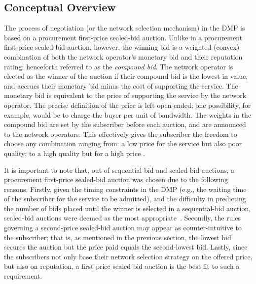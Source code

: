 \subsection{Conceptual Overview} %
\label{sub:conceptual_overview_dmp}
The process of negotiation (or the network selection mechanism) in the DMP is based on a procurement first-price sealed-bid auction. Unlike in a procurement first-price sealed-bid auction, however, the winning bid is a weighted (convex) combination of both the network operator's monetary bid and their reputation rating; henceforth referred to as the \emph{compound bid}. The network operator is elected as the winner of the auction if their compound bid is the lowest in value, and accrues their monetary bid minus the cost of supporting the service. The monetary bid is equivalent to the price of supporting the service by the network operator. The precise definition of the price is left open-ended; one possibility, for example, would be to charge the buyer per unit of bandwidth. The weights in the compound bid are set by the subscriber before each auction, and are announced to the network operators. This effectively gives the subscriber the freedom to choose any combination ranging from: a low price for the service but also poor quality; to a high quality but for a high price \cite{DMLeBodic00}.

It is important to note that, out of sequential-bid and sealed-bid auctions, a procurement first-price sealed-bid auction was chosen due to the following reasons. Firstly, given the timing constraints in the DMP (e.g., the waiting time of the subscriber for the service to be admitted), and the difficulty in predicting the number of bids placed until the winner is selected in a sequential-bid auction, sealed-bid auctions were deemed as the most appropriate~\cite{DMLeBodic00}. Secondly, the rules governing a second-price sealed-bid auction may appear as counter-intuitive to the subscriber; that is, as mentioned in the previous section, the lowest bid secures the auction but the price paid equals the second-lowest bid. Lastly, since the subscribers not only base their network selection strategy on the offered price, but also on reputation, a first-price sealed-bid auction is the best fit to such a requirement.

